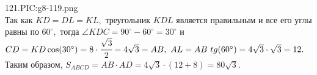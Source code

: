 121.{{PIC:g8-119.png}}\\
Так как $KD=DL=KL,$ треугольник $KDL$ является правильным и все его углы равны по $60^\circ,$ тогда $\angle KDC=90^\circ-60^\circ=30^\circ$ и $CD=KD\cos(30^\circ)=8\cdot\cfrac{\sqrt{3}}{2}=4\sqrt{3}=AB,\ AL=AB\ tg(60^\circ)=4\sqrt{3}\cdot\sqrt{3}=12.$ Таким образом, $S_{ABCD}=AB\cdot AD=4\sqrt{3}\cdot(12+8)=80\sqrt{3}.$\\
